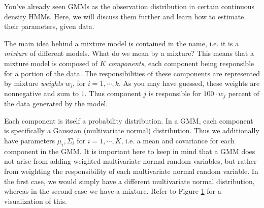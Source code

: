 

You've already seen GMMs as the observation distribution in certain continuous density HMMs. Here, we will discuss them further and learn how to estimate their parameters, given data.

The main idea behind a mixture model is contained in the name, i.e. it is a \emph{mixture} of different models. What do we mean by a mixture? This means that a mixture model is composed of $K$ \emph{components}, each component being responsible for a portion of the data. The responsibilities of these components are represented by mixture \emph{weights} $w_{i}$, for $i = 1, \cdots, k$. As you may have guessed, these weights are nonnegative and sum to $1$. Thus component $j$ is responsible for $100\cdot w_{j}$ percent of the data generated by the model.

Each component is itself a probability distribution. In a GMM, each component is specifically a Gaussian (multivariate normal) distribution. Thus we additionally have parameters $\mu_{i}, \Sigma_{i}$ for $i = 1, \cdots, K$, i.e. a mean and covariance for each component in the GMM. It is important here to keep in mind that a GMM does not arise from adding weighted multivariate normal random variables, but rather from weighting the responsibility of each multivariate normal random variable. In the first case, we would simply have a different multivariate normal distribution, whereas in the second case we have a mixture. Refer to Figure \ref{threedplots} for a visualization of this.

\begin{figure}[h]
	\centering
	\label{threedplots}
	 \\
	\caption{}
\end{figure}

